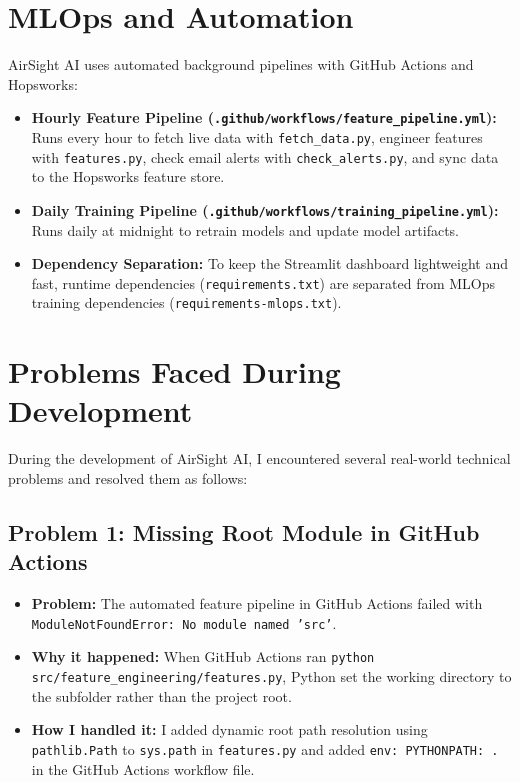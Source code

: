 \documentclass[12pt,a4paper]{article}
\begin{document}
\section{MLOps and Automation}

AirSight AI uses automated background pipelines with GitHub Actions and Hopsworks:

\begin{itemize}
    \item \textbf{Hourly Feature Pipeline (\texttt{.github/workflows/feature\_pipeline.yml}):} Runs every hour to fetch live data with \texttt{fetch\_data.py}, engineer features with \texttt{features.py}, check email alerts with \texttt{check\_alerts.py}, and sync data to the Hopsworks feature store.
    \item \textbf{Daily Training Pipeline (\texttt{.github/workflows/training\_pipeline.yml}):} Runs daily at midnight to retrain models and update model artifacts.
    \item \textbf{Dependency Separation:} To keep the Streamlit dashboard lightweight and fast, runtime dependencies (\texttt{requirements.txt}) are separated from MLOps training dependencies (\texttt{requirements-mlops.txt}).
\end{itemize}

\section{Problems Faced During Development}

During the development of AirSight AI, I encountered several real-world technical problems and resolved them as follows:

\subsection{Problem 1: Missing Root Module in GitHub Actions}
\begin{itemize}
    \item \textbf{Problem:} The automated feature pipeline in GitHub Actions failed with \texttt{ModuleNotFoundError: No module named 'src'}.
    \item \textbf{Why it happened:} When GitHub Actions ran \texttt{python src/feature\_engineering/features.py}, Python set the working directory to the subfolder rather than the project root.
    \item \textbf{How I handled it:} I added dynamic root path resolution using \texttt{pathlib.Path} to \texttt{sys.path} in \texttt{features.py} and added \texttt{env: PYTHONPATH: .} in the GitHub Actions workflow file.
\end{itemize}
\end{document}
